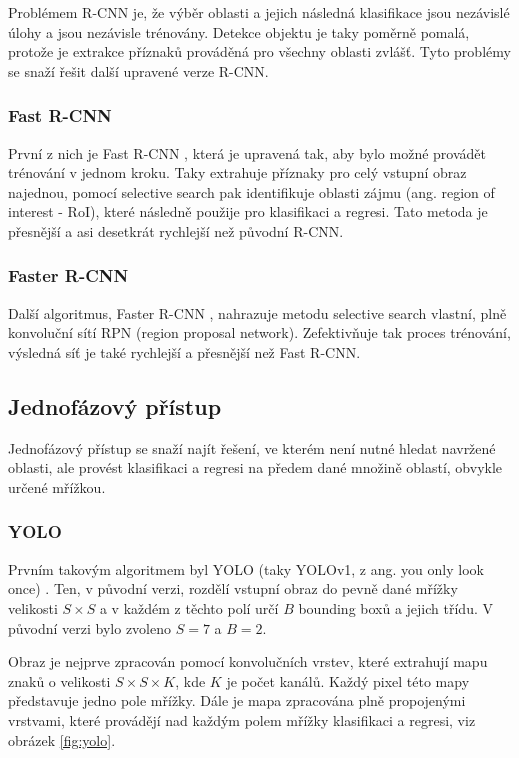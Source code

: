 Problémem R-CNN je, že výběr oblasti a jejich následná klasifikace jsou
nezávislé úlohy a jsou nezávisle trénovány. Detekce objektu je taky poměrně
pomalá, protože je extrakce příznaků prováděná pro všechny oblasti zvlášť. Tyto
problémy se snaží řešit další upravené verze R-CNN.

\subsubsection*{Fast R-CNN}
První z nich je Fast R-CNN \cite{fast-r-cnn}, která je upravená tak, aby bylo
možné provádět trénování v jednom kroku. Taky extrahuje příznaky pro celý
vstupní obraz najednou, pomocí selective search pak identifikuje oblasti zájmu
(ang. region of interest - RoI), které následně použije pro klasifikaci a
regresi. Tato metoda je přesnější a asi desetkrát rychlejší než původní R-CNN.

\subsubsection*{Faster R-CNN}
Další algoritmus, Faster R-CNN \cite{faster-r-cnn}, nahrazuje metodu selective
search vlastní, plně konvoluční sítí RPN (region proposal network).
Zefektivňuje tak proces trénování, výsledná síť je také rychlejší a přesnější
než Fast R-CNN.

\subsection{Jednofázový přístup}

Jednofázový přístup se snaží najít řešení, ve kterém není nutné hledat navržené
oblasti, ale provést klasifikaci a regresi na předem dané množině oblastí,
obvykle určené mřížkou.

\subsubsection*{YOLO}
Prvním takovým algoritmem byl YOLO (taky YOLOv1, z ang. you only look once)
\cite{yolo}. Ten, v původní verzi, rozdělí vstupní obraz do pevně dané mřížky
velikosti $S \times S$ a v každém z těchto polí určí $B$ bounding boxů a jejich
třídu. V původní verzi bylo zvoleno $S = 7$ a $B = 2$.

Obraz je nejprve zpracován pomocí konvolučních vrstev, které extrahují mapu
znaků o velikosti $S \times S \times K$, kde $K$ je počet kanálů. Každý pixel
této mapy představuje jedno pole mřížky. Dále je mapa zpracována plně
propojenými vrstvami, které provádějí nad každým polem mřížky klasifikaci a
regresi, viz obrázek \ref{fig:yolo}.

